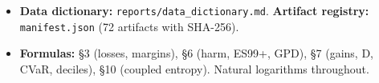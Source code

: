 \documentclass[10pt,a4paper]{article}
\begin{document}
\begin{itemize}
\item \textbf{Data dictionary:} \texttt{reports/data\_dictionary.md}. \textbf{Artifact registry:} \texttt{manifest.json} (72 artifacts with SHA-256).
\item \textbf{Formulas:} §3 (losses, margins), §6 (harm, ES99+, GPD), §7 (gains, D, CVaR, deciles), §10 (coupled entropy). Natural logarithms throughout.
\end{itemize}
\end{document}
